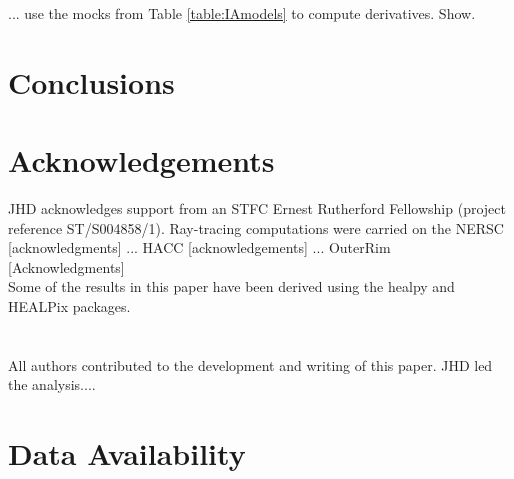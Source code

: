 \documentclass[useAMS,usenatbib]{mn2e}
\begin{document}
... use the mocks from Table \ref{table:IAmodels} to compute derivatives. Show.


\section{Conclusions}
\label{sec:conclusion}

\section*{Acknowledgements}

JHD acknowledges support from an STFC Ernest Rutherford Fellowship (project reference ST/S004858/1). Ray-tracing computations were carried on the NERSC [acknowledgments] ... HACC [acknowledgements] ... OuterRim [Acknowledgments]
\\

Some of the results in this paper have been derived using the {\sc healpy} and {\sc HEALPix} packages.
\\
\\
\\
{\footnotesize All authors contributed to the development and writing of this paper. JHD led the analysis.... }




\section*{Data Availability}

 








\end{document}
